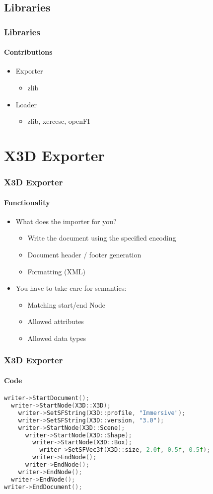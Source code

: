 \documentclass[t]{beamer}
\begin{document}
\subsection{Libraries}
\begin{frame}
\frametitle{Libraries}
\framesubtitle{Contributions}
\begin{itemize}
	\item Exporter
	\begin{itemize}
		\item zlib
	\end{itemize}
	\item Loader
	\begin{itemize}
		\item zlib, xercesc, openFI
	\end{itemize}
\end{itemize}
\end{frame}


\section{X3D Exporter}

\begin{frame}[fragile]
	\frametitle{X3D Exporter}
	\framesubtitle{Functionality}
	\begin{itemize}
	\item What does the importer for you?
	\begin{itemize}
		\item Write the document using the specified encoding
		\item Document header / footer generation
		\item Formatting (XML)
	\end{itemize}
	\item<2-> You have to take care for semantics:
	\begin{itemize}
		\item Matching start/end Node
		\item Allowed attributes
		\item Allowed data types
	\end{itemize}
	\end{itemize}
\end{frame}

\begin{frame}[fragile]
\frametitle{X3D Exporter}
	\framesubtitle{Code}
\begin{lstlisting}[language={c++}]
writer->StartDocument();
  writer->StartNode(X3D::X3D);
    writer->SetSFString(X3D::profile, "Immersive");
    writer->SetSFString(X3D::version, "3.0");
    writer->StartNode(X3D::Scene);
      writer->StartNode(X3D::Shape);
        writer->StartNode(X3D::Box);
          writer->SetSFVec3f(X3D::size, 2.0f, 0.5f, 0.5f); 
        writer->EndNode();
      writer->EndNode();
    writer->EndNode();
  writer->EndNode();
writer->EndDocument();
\end{lstlisting}
\end{frame}
\end{document}
